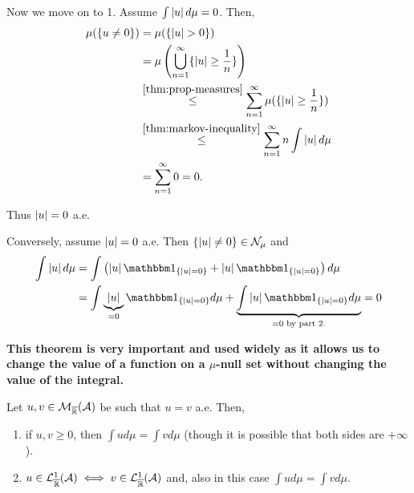 Now we move on to 1. Assume $\int \left\vert{u}\right\vert d\mu = 0$. Then,
\begin{align*}
	\mu(\{u \neq 0 \})
	&= \mu(\{ \left\vert{u}\right\vert > 0 \}) \\
	&= \mu \left( \bigcup_{n = 1}^\infty \{\left\vert{u}\right\vert \geq \frac{1}{n}\} \right) \\
	&\overset{\ref{thm:prop-measures}}{\leq} \sum_{n=1}^\infty \mu(\{ \left\vert{u}\right\vert \geq \frac{1}{n} \}) \\
	&\overset{\ref{thm:markov-inequality}}{\leq} \sum_{n=1}^\infty n \int \left\vert{u}\right\vert d\mu \\
	&= \sum_{n=1}^\infty 0 = 0.
\end{align*}

Thus $\left\vert{u}\right\vert = 0$ a.e.

Conversely, assume $\left\vert{u}\right\vert = 0$ a.e. Then $\{\left\vert{u}\right\vert \neq 0 \} \in \mathcal{N}_\mu$ and 
\begin{align*}
	\int \abs{u} d\mu
	&= \int \left( \abs{u} \ind_{\{\abs{u} = 0\}} + \abs{u} \ind_{\{ \abs{u} = 0 \}} \right)d \mu\\
	&= \int \underbrace{\abs{u}}_{= 0} \ind_{\{\abs{u} = 0\}} d\mu + \underbrace{\int \abs{u} \ind_{\{ \abs{u} = 0 \}} d\mu}_{= 0 \text{ by part 2.}} = 0
\end{align*}

\textbf{This theorem is very important and used widely as it allows us to change the value of a function on a $\mu$-null set without changing the value of the integral.}

\begin{cor}
	Let $u, v \in \mathcal{M}_{\overline{\mathbb{R}}}(\mathcal{A})$ be such that $u = v$ a.e. Then,
	\begin{enumerate}
		\item if $u, v \geq 0$, then $\int u d\mu = \int v d\mu$ (though it is possible that both sides are $+\infty$).
		\item $u \in \mathcal{L}^1_{\overline{\mathbb{R}}}(\mathcal{A}) \iff v \in \mathcal{L}_{\overline{\mathbb{R}}}^1(\mathcal{A})$ and, also in this case $\int u d\mu = \int v d\mu$.
	\end{enumerate}
\end{cor}

